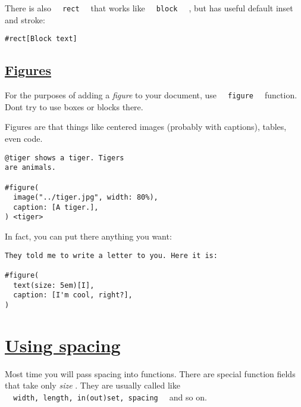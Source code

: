 There is also \texttt{\ }{\texttt{\ rect\ }}\texttt{\ } that works like
\texttt{\ }{\texttt{\ block\ }}\texttt{\ } , but has useful default
inset and stroke:

\begin{verbatim}
#rect[Block text]
\end{verbatim}

\pandocbounded{}

\subsection{\texorpdfstring{\hyperref[figures]{Figures}}{Figures}}\label{figures}

For the purposes of adding a \emph{figure} to your document, use
\texttt{\ }{\texttt{\ figure\ }}\texttt{\ } function.
Don\textquotesingle t try to use boxes or blocks there.

Figures are that things like centered images (probably with captions),
tables, even code.

\begin{verbatim}
@tiger shows a tiger. Tigers
are animals.

#figure(
  image("../tiger.jpg", width: 80%),
  caption: [A tiger.],
) <tiger>
\end{verbatim}

\pandocbounded{}

In fact, you can put there anything you want:

\begin{verbatim}
They told me to write a letter to you. Here it is:

#figure(
  text(size: 5em)[I],
  caption: [I'm cool, right?],
) 
\end{verbatim}

\pandocbounded{}

\section{\texorpdfstring{\hyperref[using-spacing]{Using
spacing}}{Using spacing}}\label{using-spacing}

Most time you will pass spacing into functions. There are special
function fields that take only \emph{size} . They are usually called
like
\texttt{\ }{\texttt{\ width,\ length,\ in(out)set,\ spacing\ }}\texttt{\ }
and so on.

